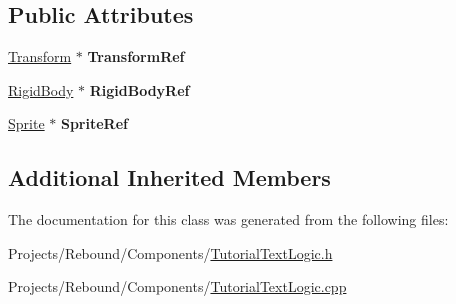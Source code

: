 \subsection*{Public Attributes}
\begin{DoxyCompactItemize}
\item 
\hypertarget{classDCEngine_1_1Components_1_1TutorialTextLogic_a50780990b1a0d2c5b9865aae1d3de7cc}{\hyperlink{classDCEngine_1_1Components_1_1Transform}{Transform} $\ast$ {\bfseries Transform\-Ref}}\label{classDCEngine_1_1Components_1_1TutorialTextLogic_a50780990b1a0d2c5b9865aae1d3de7cc}

\item 
\hypertarget{classDCEngine_1_1Components_1_1TutorialTextLogic_a16dbef414b23d86c74199f2b382283d2}{\hyperlink{classDCEngine_1_1Components_1_1RigidBody}{Rigid\-Body} $\ast$ {\bfseries Rigid\-Body\-Ref}}\label{classDCEngine_1_1Components_1_1TutorialTextLogic_a16dbef414b23d86c74199f2b382283d2}

\item 
\hypertarget{classDCEngine_1_1Components_1_1TutorialTextLogic_ac7a5c86d24bff42f623bfd2362e25581}{\hyperlink{classDCEngine_1_1Components_1_1Sprite}{Sprite} $\ast$ {\bfseries Sprite\-Ref}}\label{classDCEngine_1_1Components_1_1TutorialTextLogic_ac7a5c86d24bff42f623bfd2362e25581}

\end{DoxyCompactItemize}
\subsection*{Additional Inherited Members}


The documentation for this class was generated from the following files\-:\begin{DoxyCompactItemize}
\item 
Projects/\-Rebound/\-Components/\hyperlink{TutorialTextLogic_8h}{Tutorial\-Text\-Logic.\-h}\item 
Projects/\-Rebound/\-Components/\hyperlink{TutorialTextLogic_8cpp}{Tutorial\-Text\-Logic.\-cpp}\end{DoxyCompactItemize}
